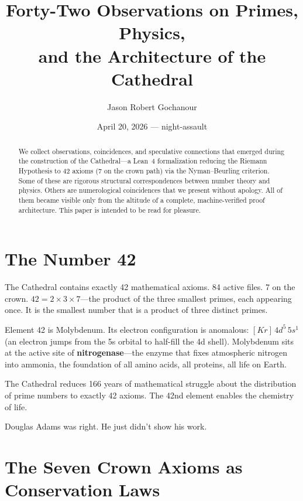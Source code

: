 \documentclass[11pt,a4paper]{article}
\title{%
  Forty-Two Observations on Primes, Physics,\\
  and the Architecture of the Cathedral%
}
\author{
  Jason Robert Gochanour
}
\date{April 20, 2026 --- night-assault}
\theoremstyle{definition}
\begin{document}
\maketitle

\begin{abstract}
We collect observations, coincidences, and speculative connections
that emerged during the construction of the Cathedral---a Lean~4
formalization reducing the Riemann Hypothesis to 42 axioms (7 on the
crown path) via the Nyman--Beurling criterion. Some of these are
rigorous structural correspondences between number theory and physics.
Others are numerological coincidences that we present without apology.
All of them became visible only from the altitude of a complete,
machine-verified proof architecture. This paper is intended to be
read for pleasure.
\end{abstract}

\tableofcontents

\section{The Number 42}

The Cathedral contains exactly 42 mathematical axioms. 84 active
files. 7 on the crown. $42 = 2 \times 3 \times 7$---the product of
the three smallest primes, each appearing once. It is the smallest
number that is a product of three distinct primes.

Element 42 is Molybdenum. Its electron configuration is anomalous:
$[Kr]\,4d^5\,5s^1$ (an electron jumps from the 5s orbital to
half-fill the 4d shell). Molybdenum sits at the active site of
\textbf{nitrogenase}---the enzyme that fixes atmospheric nitrogen
into ammonia, the foundation of all amino acids, all proteins, all
life on Earth.

The Cathedral reduces 166 years of mathematical struggle about the
distribution of prime numbers to exactly 42 axioms. The 42nd element
enables the chemistry of life.

Douglas Adams was right. He just didn't show his work.

\section{The Seven Crown Axioms as Conservation Laws}
\label{sec:noether}
\end{document}
